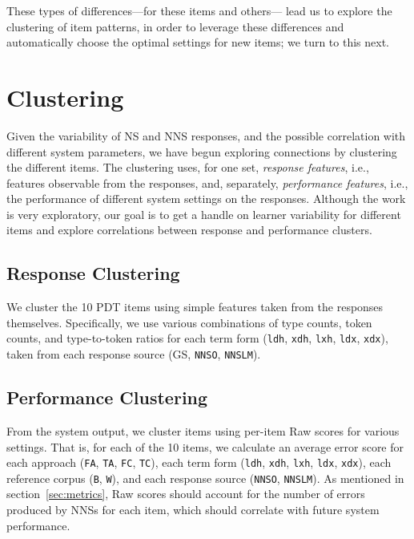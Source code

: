 \documentclass[11pt,letterpaper]{article}
\newcommand{\param}[1]{\texttt{#1}}
\newcommand{\lk}[1]{\marginpar{\scriptsize LK: #1}}
\renewcommand{\marginpar}[1]{}
\begin{document}
These types of differences---for these items and others---%
lead us to explore the clustering of item patterns, in order to
leverage these differences and automatically choose the optimal
settings for new items; we turn to this next.

\section{Clustering}
\label{sec:clustering}

Given the variability of NS and NNS responses, and the possible
correlation with different system parameters, we have begun exploring
connections by clustering the different items.  The clustering uses,
for one set, \emph{response features}, i.e., features observable from
the responses, and, separately, \emph{performance features}, i.e., the
performance of different system settings on the responses.
%
%
Although the work is very exploratory, our goal is to get a handle on
learner variability for different items and explore correlations
between response and performance clusters.


\subsection{Response Clustering}

We cluster the 10 PDT items using simple features taken from the
responses themselves. Specifically, we use various combinations of
type counts, token counts, and type-to-token ratios for each term form
(\param{ldh}, \param{xdh}, \param{lxh}, \param{ldx}, \param{xdx}),
taken from each response source (GS, \param{NNSO}, \param{NNSLM}).

\subsection{Performance Clustering}

From the system output, we cluster items using per-item Raw 
scores for various settings. That is, for each of the 10 items, we
calculate an average error score for each approach
(\param{FA}, \param{TA}, \param{FC}, \param{TC}), each term form
(\param{ldh}, \param{xdh}, \param{lxh}, \param{ldx}, \param{xdx}),
each reference corpus (\param{B}, \param{W}), and each
response source (\param{NNSO}, \param{NNSLM}). 
As mentioned in section~\ref{sec:metrics}, Raw scores should account for the number of
errors produced by NNSs for each item, which should 
correlate with future system performance.
\end{document}

